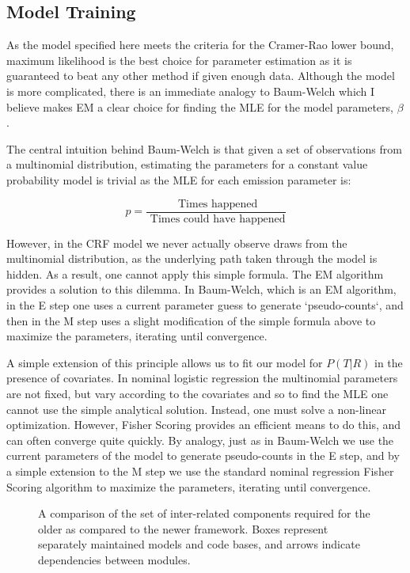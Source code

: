 \documentclass[fleqn,10pt]{SelfArx} %
\begin{document}
\subsection{Model Training}

As the model specified here meets the criteria for the Cramer-Rao lower bound, maximum likelihood is the best choice for parameter estimation as it is guaranteed to beat any other method if given enough data.  Although the model is more complicated, there is an immediate analogy to Baum-Welch which I believe makes EM a clear choice for finding the MLE for the model parameters, $\beta$.

The central intuition behind Baum-Welch is that given a set of observations from a multinomial distribution, estimating the parameters for a constant value probability model is trivial as the MLE for each emission parameter is:

\begin{dmath}
p = \frac{\text{ Times happened}}{\text{ Times could have happened}}
\end{dmath}

However, in the CRF model we never actually observe draws from the multinomial distribution, as the underlying path taken through the model is hidden.  As a result, one cannot apply this simple formula.  The EM algorithm provides a solution to this dilemma. In Baum-Welch, which is an EM algorithm, in the E step one uses a current parameter guess to generate `pseudo-counts`, and then in the M step uses a slight modification of the simple formula above to maximize the parameters, iterating until convergence.

A simple extension of this principle allows us to fit our model for $P(T|R)$ in the presence of covariates.  In nominal logistic regression the multinomial parameters are not fixed, but vary according to the covariates and so to find the MLE one cannot use the simple analytical solution.  Instead, one must solve a non-linear optimization.  However, Fisher Scoring provides an efficient means to do this, and can often converge quite quickly.  By analogy, just as in Baum-Welch we use the current parameters of the model to generate pseudo-counts in the E step, and by a simple extension to the M step we use the standard nominal regression Fisher Scoring algorithm to maximize the parameters, iterating until convergence. 



\begin{figure} %
		\caption{A comparison of the set of inter-related components required for the older as compared to the newer framework.  Boxes represent separately maintained models and code bases, and arrows indicate dependencies between modules. }				
\end{figure}
\end{document}
